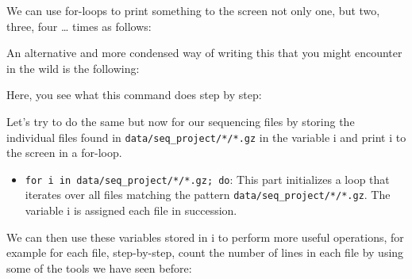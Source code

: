 \documentclass[
  letterpaper,
  DIV=11,
  numbers=noendperiod]{scrreprt}
\newenvironment{Shaded}{}{}
\newcommand{\BuiltInTok}[1]{\textcolor[rgb]{0.84,0.23,0.29}{#1}}
\newcommand{\ControlFlowTok}[1]{\textcolor[rgb]{0.84,0.23,0.29}{#1}}
\newcommand{\KeywordTok}[1]{\textcolor[rgb]{0.84,0.23,0.29}{#1}}
\newcommand{\NormalTok}[1]{\textcolor[rgb]{0.14,0.16,0.18}{#1}}
\newcommand{\PreprocessorTok}[1]{\textcolor[rgb]{0.84,0.23,0.29}{#1}}
\newcommand{\StringTok}[1]{\textcolor[rgb]{0.01,0.18,0.38}{#1}}
\newcommand{\VariableTok}[1]{\textcolor[rgb]{0.89,0.38,0.04}{#1}}
\providecommand{\tightlist}{%
  \setlength{\itemsep}{0pt}\setlength{\parskip}{0pt}}\usepackage{longtable,booktabs,array}
\begin{document}
We can use for-loops to print something to the screen not only one, but
two, three, four \ldots{} times as follows:

\begin{Shaded}
\end{Shaded}

An alternative and more condensed way of writing this that you might
encounter in the wild is the following:

\begin{Shaded}
\end{Shaded}

Here, you see what this command does step by step:

Let's try to do the same but now for our sequencing files by storing the
individual files found in \texttt{data/seq\_project/*/*.gz} in the
variable i and print i to the screen in a for-loop.

\begin{Shaded}
\end{Shaded}

\begin{itemize}
\tightlist
\item
  \texttt{for\ i\ in\ data/seq\_project/*/*.gz;\ do}: This part
  initializes a loop that iterates over all files matching the pattern
  \texttt{data/seq\_project/*/*.gz}. The variable i is assigned each
  file in succession.
\end{itemize}

We can then use these variables stored in i to perform more useful
operations, for example for each file, step-by-step, count the number of
lines in each file by using some of the tools we have seen before:
\end{document}

